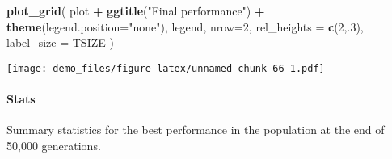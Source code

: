 \documentclass[]{book}
\newenvironment{Shaded}{\begin{snugshade}}{\end{snugshade}}
\newcommand{\DataTypeTok}[1]{\textcolor[rgb]{0.13,0.29,0.53}{#1}}
\newcommand{\DecValTok}[1]{\textcolor[rgb]{0.00,0.00,0.81}{#1}}
\newcommand{\KeywordTok}[1]{\textcolor[rgb]{0.13,0.29,0.53}{\textbf{#1}}}
\newcommand{\NormalTok}[1]{#1}
\newcommand{\OperatorTok}[1]{\textcolor[rgb]{0.81,0.36,0.00}{\textbf{#1}}}
\newcommand{\OtherTok}[1]{\textcolor[rgb]{0.56,0.35,0.01}{#1}}
\newcommand{\StringTok}[1]{\textcolor[rgb]{0.31,0.60,0.02}{#1}}
\let\oldparagraph\paragraph
\renewcommand{\paragraph}[1]{\oldparagraph{#1}\mbox{}}
\begin{document}
\begin{Shaded}
\begin{Highlighting}[]
\KeywordTok{plot_grid}\NormalTok{(}
\NormalTok{  plot }\OperatorTok{+}
\StringTok{    }\KeywordTok{ggtitle}\NormalTok{(}\StringTok{"Final performance"}\NormalTok{) }\OperatorTok{+}
\StringTok{    }\KeywordTok{theme}\NormalTok{(}\DataTypeTok{legend.position=}\StringTok{"none"}\NormalTok{),}
\NormalTok{  legend,}
  \DataTypeTok{nrow=}\DecValTok{2}\NormalTok{,}
  \DataTypeTok{rel_heights =} \KeywordTok{c}\NormalTok{(}\DecValTok{2}\NormalTok{,.}\DecValTok{3}\NormalTok{),}
  \DataTypeTok{label_size =}\NormalTok{ TSIZE}
\NormalTok{)}
\end{Highlighting}
\end{Shaded}

\texttt{[image: demo\_files/figure-latex/unnamed-chunk-66-1.pdf]}

\hypertarget{stats-35}{%
\paragraph{Stats}\label{stats-35}}

Summary statistics for the best performance in the population at the end of 50,000 generations.

\begin{Shaded}
\end{Shaded}
\end{document}

